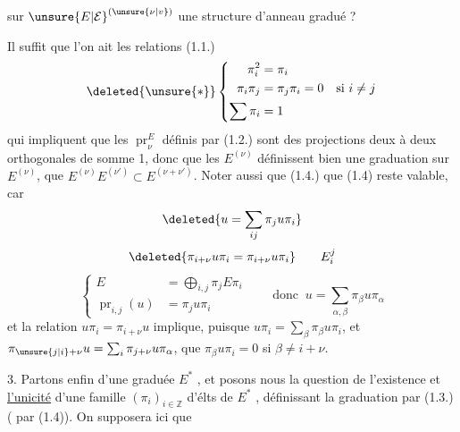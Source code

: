 
sur $\unsure{E|\mathcal E}^{(\unsure{\nu|v})}$ une structure d'anneau gradué ?

Il suffit que l'on ait les relations (1.1.)
\[
 \deleted{\unsure{*}}\left\{\begin{aligned}
 \pi_i^2&=\pi_i\\
 \pi_i\pi_j&=\pi_j\pi_i=0\quad\text{si }i\ne j\\
 \sum\pi_i&=1
 \end{aligned}\right.
\]
qui impliquent que les $\operatorname{pr}_{\nu}^{E}$ définis par (1.2.) sont des projections deux à deux orthogonales de somme 1, donc que les $E^{(\nu)}$ définissent bien une graduation  sur $E^{(\nu)}$,   que $E^{(\nu)} E^{(\nu')}\subset E^{(\nu+\nu')}$. Noter aussi que (1.4.) que (1.4) reste valable, car  
\[
 \deleted{u=\sum_{ij}\pi_j u\pi_i}
\]
\[
 \deleted{\pi_{i+\nu}u\pi_i=\pi_{i+\nu}u\pi_i}\qquad E_i^j
\]
\[
 \left\{\begin{aligned}
 E&=\bigoplus_{i,j}\pi_j E\pi_i\\
 \operatorname{pr}_{i,j}(u)&=\pi_j u\pi_i
 \end{aligned}\right.\qquad\text{donc }\ u=\sum_{\alpha,\beta}\pi_\beta u\pi_\alpha
\]
et la relation $u\pi_i=\pi_{i+\nu}u$ implique, puisque $u\pi_i=\sum_{\beta}\pi_{\beta}u\pi_i$, et $\pi_{\unsure{j|i}+\nu}u=\sum_i\pi_{j+\nu}u\pi_\alpha$, que $\pi_\beta u\pi_i=0$ si $\beta\ne i+\nu$.


3.  Partons enfin d'une   graduée $E^*$ , et posons nous la question de l'existence et \uline{l'unicité} d'une famille $(\pi_i)_{i\in\mathbb Z}$ d'élts de $E^*$ , définissant la graduation par (1.3.) (  par (1.4)). On  supposera ici que
